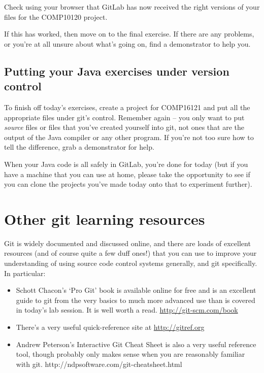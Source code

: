 Check using your browser that GitLab has now received the right versions of your files for the COMP10120 project.

If this has worked, then move on to the final exercise. If there are any problems, or you're at all unsure about what's going on, find a demonstrator to help you. 

\subsection{Putting your Java exercises under version control}

To finish off today's exercises, create a project for COMP16121 and put all the appropriate files under git's control. Remember again -- you only want to put \emph{source} files or files that you've created yourself into git, not ones that are the output of the Java compiler or any other program. If you're not too sure how to tell the difference, grab a demonstrator for help. 

When your Java code is all safely in GitLab, you're done for today (but if you have a machine that you can use at home, please take the opportunity to see if you can clone the projects you've made today onto that to experiment further). 

\section{Other git learning resources}

Git is widely documented and discussed online, and there are loads of excellent resources (and of course quite a few duff ones!) that you can use to improve your understanding of using source code control systems generally, and git specifically. In particular:

\begin{itemize}

\item Schott Chacon's `Pro Git' book is available online for free and is an excellent guide to git from the very basics to much more advanced use than is covered in today's lab session. It is well worth a read. \url{http://git-scm.com/book}

\item There's a very useful quick-reference site at \url{http://gitref.org}

\item Andrew Peterson's Interactive Git Cheat Sheet is also a very useful reference tool, though probably only makes sense when you are reasonably familiar with git. http://ndpsoftware.com/git-cheatsheet.html
\end{itemize}

